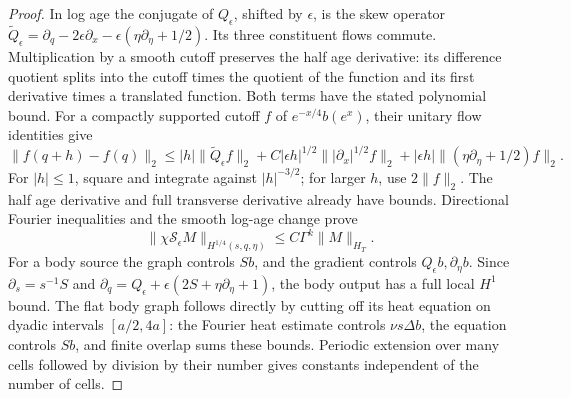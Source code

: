 \begin{proof}
In log age the conjugate of \(Q_\epsilon\), shifted by \(\epsilon\),
is the skew operator
\(\widetilde Q_\epsilon=\partial_q-2\epsilon\partial_x
                     -\epsilon(\eta\partial_\eta+1/2)\).
Its three constituent flows commute. Multiplication by a smooth cutoff
preserves the half age derivative: its difference quotient splits into
the cutoff times the quotient of the function and its first derivative
times a translated function. Both terms have the stated polynomial bound.
For a compactly supported
cutoff \(f\) of \(e^{-x/4}b(e^x)\), their unitary flow identities give
\[
 \|f(q+h)-f(q)\|_2
 \le |h|\|\widetilde Q_\epsilon f\|_2
 +C|\epsilon h|^{1/2}\||\partial_x|^{1/2}f\|_2
 +|\epsilon h|\|(\eta\partial_\eta+1/2)f\|_2.
\]
For \(|h|\le1\), square and integrate against \(|h|^{-3/2}\);
for larger \(h\), use \(2\|f\|_2\). The half age derivative
and full transverse derivative already have bounds. Directional Fourier
inequalities and the smooth log-age change prove
\begin{equation}\label{near:local-smoothing}
 \|\chi\mathcal S_\epsilon M\|_{H^{1/4}(s,q,\eta)}
       \le C\Gamma^k\|M\|_{H_T}.
\end{equation}
For a body source the graph controls \(Sb\), and the gradient controls
\(Q_\epsilon b,\partial_\eta b\). Since
\(\partial_s=s^{-1}S\) and
\(\partial_q=Q_\epsilon+\epsilon(2S+\eta\partial_\eta+1)\),
the body output has a full local \(H^1\) bound.
The flat body graph follows directly by cutting off its heat equation
on dyadic intervals \([a/2,4a]\): the Fourier heat estimate controls
\(\nu s\Delta b\), the equation controls \(Sb\), and finite overlap
sums these bounds. Periodic extension over many cells followed by division
by their number gives constants independent of the number of cells.


\end{proof}
